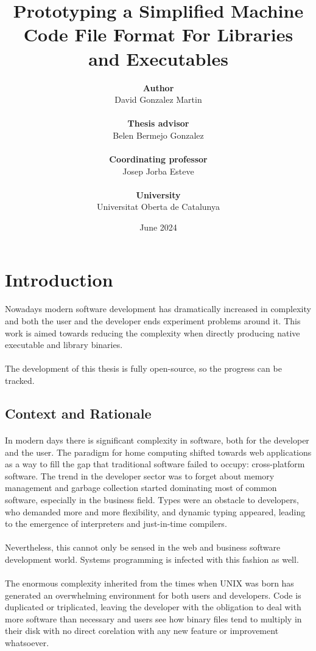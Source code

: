 \documentclass[12pt]{article}
\title{\textbf{Prototyping a Simplified Machine Code File Format For Libraries and Executables}}
\author{\textbf{Author}\\David Gonzalez Martin\\\\\textbf{Thesis advisor}\\Belen Bermejo Gonzalez\\\\\textbf{Coordinating professor}\\Josep Jorba Esteve\\\\\textbf{University}\\Universitat Oberta de Catalunya}
\date{June 2024}
\begin{document}
	\maketitle{}
	\newpage
	\tableofcontents
	\newpage
	\section{Introduction}
	\paragraph{} Nowadays modern software development has dramatically increased in complexity and both the user and the developer ends experiment problems around it. This work is aimed towards reducing the complexity when directly producing native executable and library binaries.
	\paragraph{} The development of this thesis is fully open-source, so the progress can be tracked\cite{self}.
	\subsection{Context and Rationale}
	\paragraph{}In modern days there is significant complexity in software, both for the developer and the user. The paradigm for home computing shifted towards web applications as a way to fill the gap that traditional software failed to occupy: cross-platform software. The trend in the developer sector was to forget about memory management and garbage collection started dominating most of common software, especially in the business field. Types were an obstacle to developers, who demanded more and more flexibility, and dynamic typing appeared, leading to the emergence of interpreters and just-in-time compilers.
	\paragraph{}Nevertheless, this cannot only be sensed in the web and business software development world. Systems programming is infected with this fashion as well.
	\paragraph{} The enormous complexity inherited from the times when UNIX was born has generated an overwhelming environment for both users and developers. Code is duplicated or triplicated, leaving the developer with the obligation to deal with more software than necessary and users see how binary files tend to multiply in their disk with no direct corelation with any new feature or improvement whatsoever.
\end{document}
